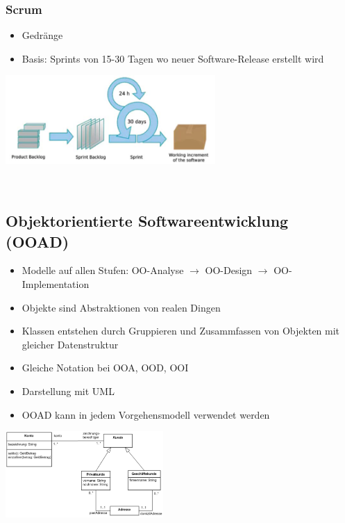\begin{multicols}{2}
\subsubsection{Scrum} %
\begin{minipage}[l]{10cm}
	\begin{itemize}
		\item Gedränge
		\item Basis: Sprints von 15-30 Tagen wo neuer Software-Release erstellt wird
	\end{itemize}
\end{minipage}
\begin{minipage}{7cm}
	\includegraphics[width=8cm]{images/scrum.png}
\end{minipage}
\\
\end{multicols}

\subsection{Objektorientierte Softwareentwicklung (OOAD)}
\begin{minipage}{13cm}
	\begin{itemize}
		\item Modelle auf allen Stufen: OO-Analyse $\rightarrow$ OO-Design $\rightarrow$ OO-Implementation
		\item Objekte sind Abstraktionen von realen Dingen
		\item Klassen entstehen durch Gruppieren und Zusammfassen von Objekten mit gleicher Datenstruktur
		\item Gleiche Notation bei OOA, OOD, OOI
		\item Darstellung mit UML
		\item OOAD kann in jedem Vorgehensmodell verwendet werden
	\end{itemize}
\end{minipage}
\begin{minipage}{6cm}%
	\includegraphics[width=6cm]{images/uml.png}
\end{minipage}

